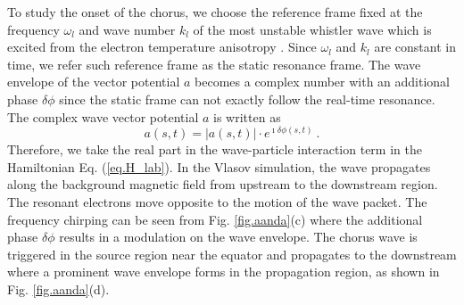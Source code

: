 To study the onset of the chorus, we choose the reference frame fixed at the frequency  $\omega_l$ and wave number $k_l$  of the most unstable whistler wave which is excited from the electron temperature anisotropy \cite{gary_1993}. 
Since $\omega_l$ and $k_l$ are constant in time, we refer such reference frame as the static resonance frame. 
The  wave envelope of the vector potential $a$ becomes a complex number with an additional phase $\delta \phi$ since the static frame can not exactly follow the real-time resonance. 
The complex wave vector potential $a$ is written as 
\begin{equation}
    a(s,t) = |a(s,t)| \cdot e^{\imath \delta \phi(s,t)}~.
\end{equation}
Therefore, we take the real part in the wave-particle interaction term in the  Hamiltonian Eq. (\ref{eq.H_lab}).
In the Vlasov simulation,
 the wave propagates along the background magnetic field from upstream to the downstream region.
The resonant electrons 
move opposite to the motion of the wave packet.  
The frequency chirping can be seen from Fig. \ref{fig.aanda}(c) where the additional phase $\delta \phi$ results in a modulation on the wave envelope.
The chorus wave is triggered in the source region near the equator and propagates to the downstream where  a prominent wave envelope forms in the propagation region, as shown in Fig. \ref{fig.aanda}(d).



